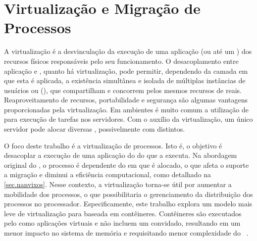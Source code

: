 \section{Virtualização e Migração de Processos}
\label{sec.virtualizacao}

A virtualização é a desvinculação da execução de uma aplicação (ou até um \so) dos recursos físicos responsáveis pelo seu funcionamento. O desacoplamento entre aplicação e \hardware, quanto há virtualização, pode permitir, dependendo da camada em que esta é aplicada, a existência simultânea e isolada de múltiplas instâncias de usuários ou \oss (\vms), que compartilham e concorrem pelos mesmos recursos de \hardware reais. Reaproveitamento de recursos, portabilidade e segurança são algumas vantagens proporcionadas pela virtualização.
%
Em ambientes \cloud é muito comum a utilização de \vms para execução de tarefas nos servidores. Com o auxílio da virtualização, um único servidor pode alocar diversas \vms, possivelmente com \oss distintos. 

O foco deste trabalho é a virtualização de processos. Isto é, o objetivo é desacoplar a execução de uma aplicação do \cluster do \lw que a executa. Na abordagem original do \nanvix, o processo é dependente do \cluster em que é alocado, o que afeta o suporte a migração e diminui a eficiência computacional, como detalhado na \autoref{sec.nanvixos}. Nesse contexto, a virtualização torna-se útil por aumentar a mobilidade dos processos, o que possibilitaria o gerenciamento da distribuição dos processos no processador. Especificamente, este trabalho explora um modelo mais leve de virtualização para \lws baseada em contêineres. Contêineres são executados pelo \os como aplicações virtuais e não incluem um \os convidado, resultando em um menor impacto no sistema de memória e requisitando menor complexidade do \hardware~\cite{thalheim2018cntr, sharma2016containers}.